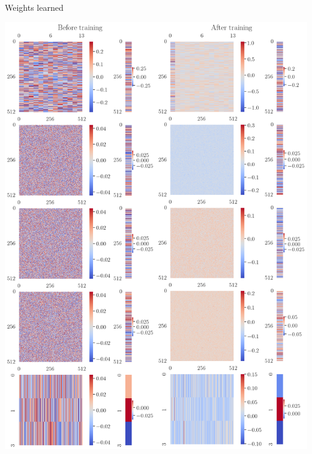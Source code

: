 \documentclass[bigger]{beamer}
\begin{document}
\begin{frame}[label={sec:orga1561a2}]{Weights learned}
\begin{center}
\includegraphics[height=0.9\textheight]{img/weights-matrices.png}
\end{center}
\end{frame}
\end{document}
